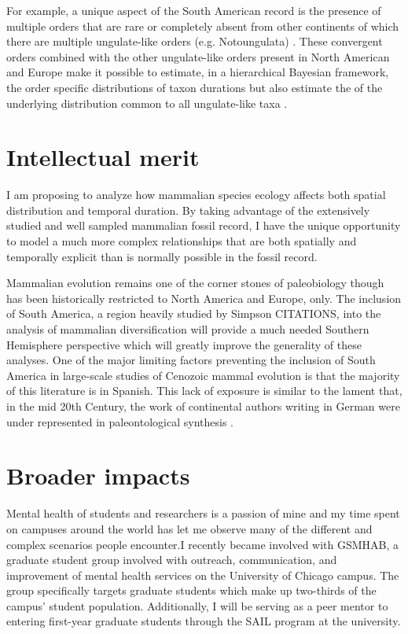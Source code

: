 \documentclass[11pt,letterpaper]{article}
\begin{document}
For example, a unique aspect of the South American record is the presence of multiple orders that are rare or completely absent from other continents of which there are multiple ungulate-like orders (e.g. Notoungulata) \citep{Marshall1982,Macfadden1997,Macfadden2006,Flynn1998a}. These convergent orders combined with the other ungulate-like orders present in North American and Europe make it possible to estimate, in a hierarchical Bayesian framework, the order specific distributions of taxon durations but also estimate the of the underlying distribution common to all ungulate-like taxa \citep{Gelman2013d}.


\section{Intellectual merit}
I am proposing to analyze how mammalian species ecology affects both spatial distribution and temporal duration. By taking advantage of the extensively studied and well sampled mammalian fossil record, I have the unique opportunity to model a much more complex relationships that are both spatially and temporally explicit than is normally possible in the fossil record. 

Mammalian evolution remains one of the corner stones of paleobiology \citep{Simpson1944} though has been historically restricted to North America and Europe, only. The inclusion of South America, a region heavily studied by Simpson CITATIONS, into the analysis of mammalian diversification will provide a much needed Southern Hemisphere perspective which will greatly improve the generality of these analyses. One of the major limiting factors preventing the inclusion of South America in large-scale studies of Cenozoic mammal evolution is that the majority of this literature is in Spanish. This lack of exposure is similar to the lament that, in the mid 20th Century, the work of continental authors writing in German were under represented in paleontological synthesis \citep{Gould1979a}.


\section{Broader impacts}
Mental health of students and researchers is a passion of mine and my time spent on campuses around the world has let me observe many of the different and complex scenarios people encounter.I recently became involved with GSMHAB, a graduate student group involved with outreach, communication, and improvement of mental health services on the University of Chicago campus. The group specifically targets graduate students which make up two-thirds of the campus' student population. Additionally, I will be serving as a peer mentor to entering first-year graduate students through the SAIL program at the university.
\end{document}
